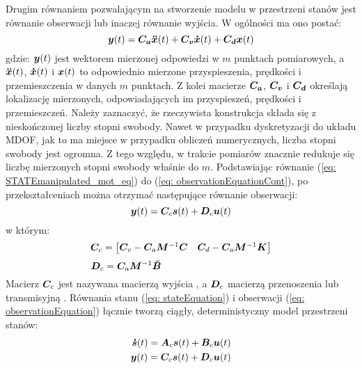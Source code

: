 Drugim równaniem pozwalającym na stworzenie modelu w przestrzeni stanów jest równanie obserwacji  lub inaczej równanie wyjścia. W ogólności ma ono postać:
\begin{equation} \label{eq: observationEquationCont}
	\bm{y}(t) = \bm{C_a}\bm{\ddot{x}}(t) + \bm{C_v}\bm{\dot{x}}(t) +\bm{C_d}\bm{x}(t)
\end{equation}
gdzie: $\bm{y}(t)$ jest wektorem mierzonej odpowiedzi w $m$ punktach pomiarowych, a $\bm{\ddot{x}}(t)$, $\bm{\dot{x}}(t)$ i $\bm{x}(t)$ to odpowiednio mierzone przyspieszenia, prędkości i przemieszczenia w danych $m$ punktach. Z kolei macierze $\bm{C_a}$, $\bm{C_v}$ i $\bm{C_d}$ określają lokalizację mierzonych, odpowiadających im przyspieszeń, prędkości i przemieszczeń. Należy zaznaczyć, że rzeczywista konstrukcja składa się z nieskończonej liczby stopni swobody. Nawet w przypadku dyskretyzacji do układu MDOF, jak to ma miejsce w przypadku obliczeń numerycznych, liczba stopni swobody jest ogromna. Z tego względu, w trakcie pomiarów znacznie redukuje się liczbę mierzonych stopni swobody właśnie do $m$. Podstawiając równanie (\ref{eq: STATEmanipulated_mot_eq}) do (\ref{eq: observationEquationCont}), po przekształceniach można otrzymać następujące równanie obserwacji:
\begin{equation} \label{eq: observationEquation}
	\bm{y}(t) = \bm{C}_c\bm{s}(t)+\bm{D}_c\bm{u}(t)
\end{equation}
w którym:
\begin{equation}
	\bm{C}_c = 
	\begin{bmatrix} 
		\bm{C}_v-\bm{C}_a\bm{M}^{-1}\bm{C}  &  \bm{C}_d-\bm{C}_a\bm{M}^{-1}\bm{K}
	\end{bmatrix}
\end{equation}
\begin{equation}
	\bm{D}_c = \bm{C}_a\bm{M}^{-1}\bm{\bar{B}} \phantom{\qquad\qquad\qquad\qquad\qquad\quad.}
	\end{equation}
Macierz $\bm{C}_c$ jest nazywana macierzą wyjścia , a $\bm{D}_c$ macierzą przenoszenia lub transmisyjną . Równania stanu (\ref{eq: stateEquation}) i obserwacji (\ref{eq: observationEquation}) łącznie tworzą ciągły, deterministyczny model przestrzeni stanów:
\begin{equation} \label{eq: con_state_space_model}
	\begin{aligned}
\bm{\dot{s}}(t)= \bm{A}_c\bm{s}(t)+\bm{B}_c\bm{u}(t) \\
\bm{y}(t) = \bm{C}_c\bm{s}(t)+\bm{D}_c\bm{u}(t)
	\end{aligned}
\end{equation}

